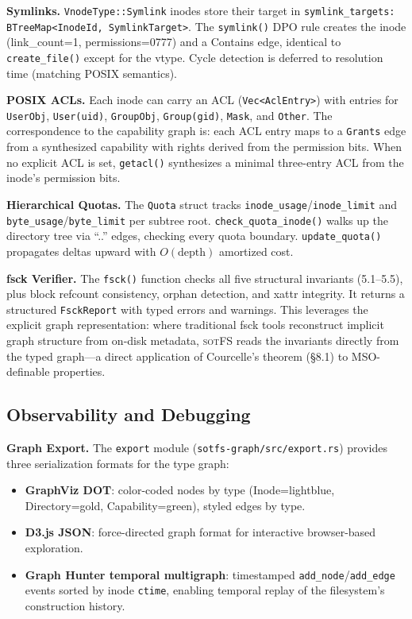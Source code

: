 \documentclass[11pt,a4paper]{article}
\theoremstyle{definition}
\newcommand{\sotfs}{\textsc{sotFS}}
\begin{document}
\textbf{Symlinks.}  \texttt{VnodeType::Symlink} inodes store their target in
\texttt{symlink\_targets: BTreeMap<InodeId, SymlinkTarget>}.  The
\texttt{symlink()} DPO rule creates the inode (link\_count=1, permissions=0777)
and a Contains edge, identical to \texttt{create\_file()} except for the vtype.
Cycle detection is deferred to resolution time (matching POSIX semantics).

\textbf{POSIX ACLs.}  Each inode can carry an ACL (\texttt{Vec<AclEntry>}) with
entries for \texttt{UserObj}, \texttt{User(uid)}, \texttt{GroupObj},
\texttt{Group(gid)}, \texttt{Mask}, and \texttt{Other}.  The correspondence to
the capability graph is: each ACL entry maps to a \texttt{Grants} edge from a
synthesized capability with rights derived from the permission bits.  When no
explicit ACL is set, \texttt{getacl()} synthesizes a minimal three-entry ACL
from the inode's permission bits.

\textbf{Hierarchical Quotas.}  The \texttt{Quota} struct tracks
\texttt{inode\_usage}/\texttt{inode\_limit} and \texttt{byte\_usage}/\texttt{byte\_limit}
per subtree root.  \texttt{check\_quota\_inode()} walks up the directory tree via
``..'' edges, checking every quota boundary.  \texttt{update\_quota()} propagates
deltas upward with $O(\text{depth})$ amortized cost.

\textbf{fsck Verifier.}  The \texttt{fsck()} function checks all five structural
invariants (5.1--5.5), plus block refcount consistency, orphan detection, and
xattr integrity.  It returns a structured \texttt{FsckReport} with typed errors
and warnings.  This leverages the explicit graph representation: where traditional
fsck tools reconstruct implicit graph structure from on-disk metadata, \sotfs{}
reads the invariants directly from the typed graph---a direct application of
Courcelle's theorem (\S8.1) to MSO-definable properties.

\subsection{Observability and Debugging}

\textbf{Graph Export.}  The \texttt{export} module (\texttt{sotfs-graph/src/export.rs})
provides three serialization formats for the type graph:
\begin{itemize}[nosep]
\item \textbf{GraphViz DOT}: color-coded nodes by type (Inode=lightblue,
  Directory=gold, Capability=green), styled edges by type.
\item \textbf{D3.js JSON}: force-directed graph format for interactive
  browser-based exploration.
\item \textbf{Graph Hunter temporal multigraph}: timestamped \texttt{add\_node}/\texttt{add\_edge}
  events sorted by inode \texttt{ctime}, enabling temporal replay of the
  filesystem's construction history.
\end{itemize}
\end{document}
